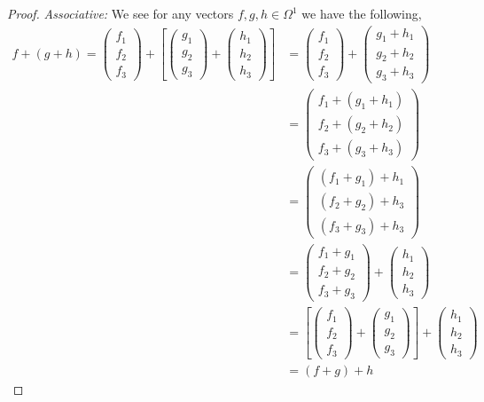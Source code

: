 \documentclass[12pt]{article}
\begin{document}
\begin{itemize}
\begin{itemize}
\begin{proof}
                \textit{Associative:} We see for any vectors $f,g,h \in \Omega^1$ we have the following,
                \begin{align*}
                    f+ (g+h) = \begin{pmatrix}f_1 \\ f_2 \\ f_3 \end{pmatrix} + \left[ \begin{pmatrix}g_1 \\ g_2 \\ g_3 \end{pmatrix} +\begin{pmatrix}h_1 \\ h_2 \\ h_3 \end{pmatrix}\right] &= \begin{pmatrix}f_1 \\ f_2 \\ f_3 \end{pmatrix} + \begin{pmatrix}g_1 + h_1 \\ g_2  + h_2\\ g_3  + h_3\end{pmatrix}\\
                    &= \begin{pmatrix}f_1 + (g_1 + h_1)\\ f_2 + (g_2 + h_2) \\ f_3 + (g_3 + h_3) \end{pmatrix} \\
                    &= \begin{pmatrix}(f_1+g_1) + h_1  \\ (f_2 + g_2) + h_3 \\ (f_3+ g_3) + h_3 \end{pmatrix}\\
                    &=\begin{pmatrix}f_1 + g_1 \\ f_2 + g_2 \\ f_3 + g_3 \end{pmatrix} + \begin{pmatrix}h_1 \\ h_2 \\ h_3 \end{pmatrix} \\
                    &= \left[\begin{pmatrix}f_1 \\ f_2 \\ f_3 \end{pmatrix} + \begin{pmatrix}g_1 \\ g_2 \\g_3 \end{pmatrix}\right] + \begin{pmatrix}h_1 \\ h_2 \\ h_3 \end{pmatrix} \\
                    &= (f+g) + h
                \end{align*}


\end{proof}
\end{itemize}
\end{itemize}
\end{document}
